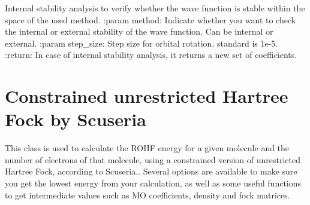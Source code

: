 \documentclass[letterpaper,10pt,english]{sphinxmanual}
\begin{document}
\begin{fulllineitems}
\begin{fulllineitems}
\end{fulllineitems}


\begin{fulllineitems}
\label{\detokenize{UHF:hf.UHF.UHF.stability_analysis}}
Internal stability analysis to verify whether the wave function is stable within the space of the used method.
:param method: Indicate whether you want to check the internal or external stability of the wave function. Can
be internal or external.
:param step\_size: Step size for orbital rotation. standard is 1e-5.
:return: In case of internal stability analysis, it returns a new set of coefficients.

\end{fulllineitems}


\end{fulllineitems}

\label{\detokenize{cUHF_s:module-hf.cUHF_s}}

\chapter{Constrained unrestricted Hartree Fock by Scuseria}
\label{\detokenize{cUHF_s:constrained-unrestricted-hartree-fock-by-scuseria}}\label{\detokenize{cUHF_s::doc}}
This class is used to calculate the ROHF energy for a given molecule and the number of electrons of that molecule,
using a constrained version of unrestricted Hartree Fock, according to Scuseria..
Several options are available to make sure you get the lowest energy from your calculation, as well as some useful
functions to get intermediate values such as MO coefficients, density and fock matrices.
\end{document}
